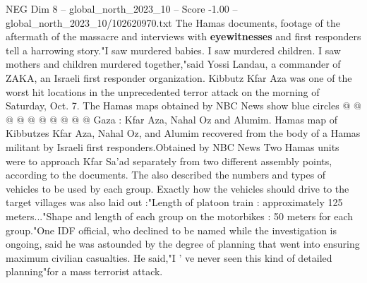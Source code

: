 \begin{textsample}{NEG Dim 8 – global\_north\_2023\_10 – Score -1.00 – global\_north\_2023\_10/102620970.txt}
The Hamas documents, footage of the aftermath of the massacre and interviews with \textbf{eyewitnesses} and first responders tell a harrowing story."I saw murdered babies.
I saw murdered children.
I saw mothers and children murdered together,"said Yossi Landau, a commander of ZAKA, an Israeli first responder organization.
Kibbutz Kfar Aza was one of the worst hit locations in the unprecedented terror attack on the morning of Saturday, Oct. 7.
The Hamas maps obtained by NBC News show blue circles @ @ @ @ @ @ @ @ @ @ Gaza : Kfar Aza, Nahal Oz and Alumim.
Hamas map of Kibbutzes Kfar Aza, Nahal Oz, and Alumim recovered from the body of a Hamas militant by Israeli first responders.Obtained by NBC News Two Hamas units were to approach Kfar Sa'ad separately from two different assembly points, according to the documents.
The also described the numbers and types of vehicles to be used by each group.
Exactly how the vehicles should drive to the target villages was also laid out :"Length of platoon train : approximately 125 meters..."Shape and length of each group on the motorbikes : 50 meters for each group."One IDF official, who declined to be named while the investigation is ongoing, said he was astounded by the degree of planning that went into ensuring maximum civilian casualties.
He said,"I ' ve never seen this kind of detailed planning"for a mass terrorist attack.

\end{textsample}
